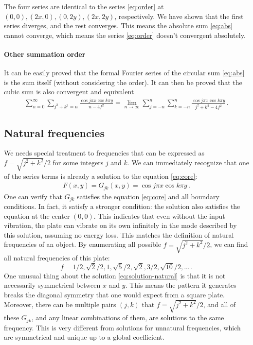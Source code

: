 \documentclass[]{article}
\begin{document}
The four series  are identical to the series \eqref{eq:order} at $(0, 0), (2x, 0), (0, 2y), (2x, 2y)$, respectively. We have shown that the first series diverges, and the rest converges. This means the absolute sum \eqref{eq:abs} cannot converge, which means the series \eqref{eq:order} doesn't convergent absolutely.

\paragraph{Other summation order}
It can be easily proved that the formal Fourier series of the circular sum \eqref{eq:abs} is the sum itself (without considering the order). It can then be proved \cite{cite:sum} that the cubic sum is also convergent and equivalent
\begin{align*}
\sum_{n=0}^{\infty}\sum_{j^2+k^2=n} \frac{\cos j\pi x \cos k\pi y}{n - 4f^2} = \lim_{n\to\infty}\sum_{j=-n}^{n}\sum_{k=-n}^{n}\frac{\cos j\pi x \cos k\pi y}{j^2 + k^2 - 4f^2}\,.
\end{align*}

\subsection{Natural frequencies}
We needs special treatment to frequencies that can be expressed as $f = \sqrt{j^2 + k^2} / 2$ for some integers $j$ and $k$. We can immediately recognize that one of the series terms is already a solution to the equation \eqref{eq:core}:
\begin{align}
F(x, y) = G_{jk}(x, y) = \cos j\pi x \cos k\pi y\,.\label{eq:solution-natural}
\end{align}
One can verify that $G_{jk}$ satisfies the equation \eqref{eq:core} and all boundary conditions. In fact, it satisfy a stronger condition: the solution also satisfies the equation at the center $(0, 0)$. This indicates that even without the input vibration, the plate can vibrate on its own infinitely in the mode described by this solution, assuming no energy loss. This matches the definition of natural frequencies of an object. By enumerating all possible $f = \sqrt{j^2 + k^2} / 2$, we can find all natural frequencies of this plate: 
\[
f = 1/2, \sqrt{2}/2, 1, \sqrt{5}/2, \sqrt{2}, 3/2, \sqrt{10}/2, ...\,.
\]
One unusual thing about the solution \eqref{eq:solution-natural} is that it is not necessarily symmetrical between $x$ and $y$. This means the pattern it generates breaks the diagonal symmetry that one would expect from a square plate. Moreover, there can be multiple pairs $(j, k)$ that $f = \sqrt{j^2 + k^2} / 2$, and all of these $G_{jk}$, and any linear combinations of them, are solutions to the same frequency. This is very different from solutions for unnatural frequencies, which are symmetrical and unique up to a global coefficient.
\end{document}
